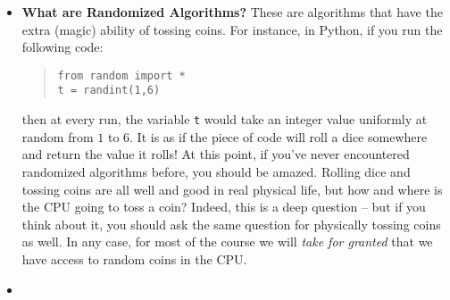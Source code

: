 \documentclass[11pt]{article}
\begin{document}
\begin{itemize}
	\item {\bf What are Randomized Algorithms?} These are algorithms that have the extra (magic) ability of tossing coins. For instance, in Python, if you run the following code: 
\begin{quote}
	{\tt from random import * \\
	\hspace{1cm}	t = randint(1,6)}
	\end{quote}
	then at every run, the variable {\tt t} would take an integer value uniformly at random from $1$ to $6$. It is as if the piece of code will roll a dice somewhere and return the value it rolls!
	At this point, if you've never encountered randomized algorithms before, you should be amazed. Rolling dice and tossing coins are all well and good in real physical life, but how and where is the CPU going  to toss a coin? Indeed, this is a deep question -- but if you think about it, you should ask the same question for physically tossing coins as well. In any case, for most of the course we will {\em take for granted} that we have access to random coins in the CPU. 

\item 

\end{itemize}
\end{document}
